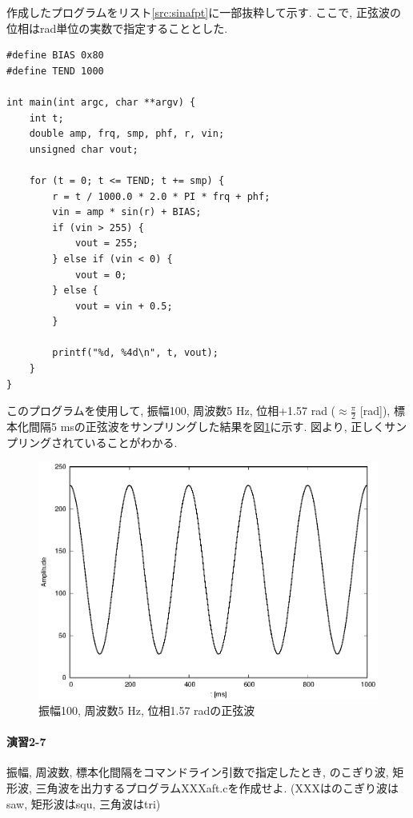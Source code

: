 \documentclass[titlepage]{jsarticle}
\begin{document}
        作成したプログラムをリスト\ref{src:sinafpt}に一部抜粋して示す.
        ここで, 正弦波の位相はrad単位の実数で指定することとした.

        \begin{lstlisting}[caption=sinafpt.c, label=src:sinafpt]
#define BIAS 0x80
#define TEND 1000

int main(int argc, char **argv) {
    int t;
    double amp, frq, smp, phf, r, vin;
    unsigned char vout;

    for (t = 0; t <= TEND; t += smp) {
        r = t / 1000.0 * 2.0 * PI * frq + phf;
        vin = amp * sin(r) + BIAS;
        if (vin > 255) {
            vout = 255;
        } else if (vin < 0) {
            vout = 0;
        } else {
            vout = vin + 0.5;
        }

        printf("%d, %4d\n", t, vout);
    }
}\end{lstlisting}

        このプログラムを使用して, 振幅100, 周波数5 Hz,
        位相+1.57 rad ($\displaystyle\approx \frac{\pi}{2}$ [rad]),
        標本化間隔5 msの正弦波をサンプリングした結果を図\ref{fig:sinafpt}に示す.
        図より, 正しくサンプリングされていることがわかる.

        \begin{figure}[h]
            \centering
            \includegraphics[width=0.8\hsize]{images/sin.eps}
            \caption{振幅100, 周波数5 Hz, 位相1.57 radの正弦波}
            \label{fig:sinafpt}
        \end{figure}
    
    \paragraph{演習2-7} 振幅, 周波数, 標本化間隔をコマンドライン引数で指定したとき,
    のこぎり波, 矩形波, 三角波を出力するプログラムXXXaft.cを作成せよ.
    (XXXはのこぎり波はsaw, 矩形波はsqu, 三角波はtri)
\end{document}
